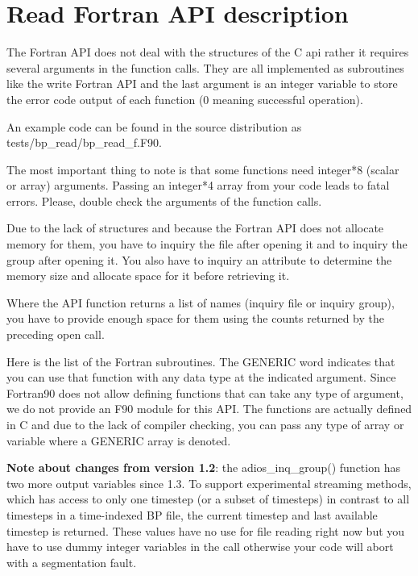 \documentclass{report}
\begin{document}
\section{Read Fortran API description}

The Fortran API does not deal with the structures of the C api rather it requires 
several arguments in the function calls.  They are all implemented as subroutines 
like the write Fortran API and the last argument is an integer variable to store 
the error code output of each function (0 meaning successful operation). 

An example code can be found in the source distribution as tests/bp\_read/bp\_read\_f.F90.

The most important thing to note is that some functions need integer*8 (scalar 
or array) arguments. Passing an integer*4 array from your code leads to fatal errors. 
Please, double check the arguments of the function calls. 

Due to the lack of structures and because the Fortran API does not allocate memory 
for them, you have to inquiry the file after opening it and to inquiry the group 
after opening it. You also have to inquiry an attribute to determine the memory 
size and allocate space for it before retrieving it. 

Where the API function returns a list of names (inquiry file or inquiry group), 
you have to provide enough space for them using the counts returned by the preceding 
open call. 

Here is the list of the Fortran subroutines. The GENERIC word indicates that you 
can use that function with any data type at the indicated argument. Since Fortran90 
does not allow defining functions that can take any type of argument, we do not 
provide an F90 module for this API. The functions are actually defined in C and 
due to the lack of compiler checking, you can pass any type of array or variable 
where a GENERIC array is denoted. 

\textbf{Note about changes from version 1.2}: the adios\_inq\_group() function 
has two more output variables since 1.3. To support experimental streaming methods, 
which has access to only one timestep (or a subset of timesteps) in contrast to 
all timesteps in a time-indexed BP file, the current timestep and last available 
timestep is returned. These values have no use for file reading right now but you 
have to use dummy integer variables in the call otherwise your code will abort 
with a segmentation fault. 
\end{document}
